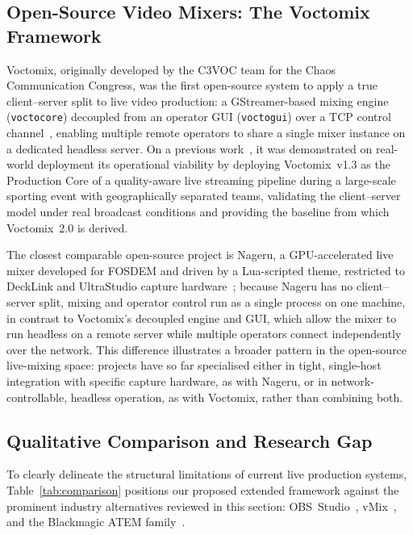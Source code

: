 \documentclass[electronics,article,submit,pdftex,moreauthors]{Definitions/mdpi}
\begin{document}
\subsection{Open-Source Video Mixers: The Voctomix Framework}
\label{sec:background:voctomix}

Voctomix, originally developed by the C3VOC team for the Chaos Communication Congress, was the first open-source system to apply a true client--server split to live video production: a GStreamer-based mixing engine (\texttt{voctocore}) decoupled from an operator GUI (\texttt{voctogui}) over a TCP control channel~\cite{voctomix_github,c3voc_voctomix_origin}, enabling multiple remote operators to share a single mixer instance on a dedicated headless server. On a previous work~\cite{delRio2025}, it was demonstrated on real-world deployment its operational viability by deploying Voctomix~v1.3 as the Production Core of a quality-aware live streaming pipeline during a large-scale sporting event with geographically separated teams, validating the client--server model under real broadcast conditions and providing the baseline from which Voctomix~2.0 is derived.

The closest comparable open-source project is Nageru, a GPU-accelerated live mixer developed for FOSDEM and driven by a Lua-scripted theme, restricted to DeckLink and UltraStudio capture hardware~\cite{nageru_project,gunderson2016_nageru_fosdem}; because Nageru has no client--server split, mixing and operator control run as a single process on one machine, in contrast to Voctomix's decoupled engine and GUI, which allow the mixer to run headless on a remote server while multiple operators connect independently over the network. This difference illustrates a broader pattern in the open-source live-mixing space: projects have so far specialised either in tight, single-host integration with specific capture hardware, as with Nageru, or in network-controllable, headless operation, as with Voctomix, rather than combining both.


\subsection{Qualitative Comparison and Research Gap}

To clearly delineate the structural limitations of current live production systems, Table~\ref{tab:comparison} positions our proposed extended framework against the prominent industry alternatives reviewed in this section: OBS~Studio~\cite{obs_studio}, vMix~\cite{vmix_software}, and the Blackmagic ATEM family~\cite{blackmagic_atem}.
\end{document}
